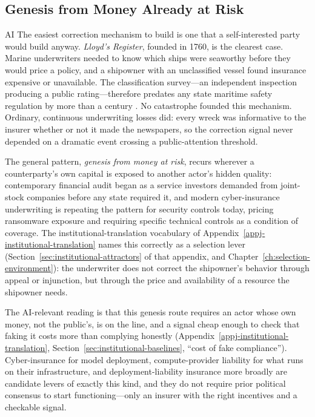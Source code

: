 \begin{refsection}
\section{Genesis from Money Already at Risk}
\label{sec:appm-genesis-money}
\begin{authbar}{AI}
The easiest correction mechanism to build is one that a self-interested party would build anyway.
\emph{Lloyd's Register}, founded in 1760, is the clearest case.
Marine underwriters needed to know which ships were seaworthy before they would price a policy, and a shipowner with an unclassified vessel found insurance expensive or unavailable.
The classification survey---an independent inspection producing a public rating---therefore predates any state maritime safety regulation by more than a century \autocite{kingston2007marine}.
No catastrophe founded this mechanism.
Ordinary, continuous underwriting losses did: every wreck was informative to the insurer whether or not it made the newspapers, so the correction signal never depended on a dramatic event crossing a public-attention threshold.

The general pattern, \emph{genesis from money at risk}, recurs wherever a counterparty's own capital is exposed to another actor's hidden quality: contemporary financial audit began as a service investors demanded from joint-stock companies before any state required it, and modern cyber-insurance underwriting is repeating the pattern for security controls today, pricing ransomware exposure and requiring specific technical controls as a condition of coverage.
The institutional-translation vocabulary of Appendix~\ref{appj-institutional-translation} names this correctly as a selection lever (Section~\ref{sec:institutional-attractors} of that appendix, and Chapter~\ref{ch:selection-environment}): the underwriter does not correct the shipowner's behavior through appeal or injunction, but through the price and availability of a resource the shipowner needs.

The AI-relevant reading is that this genesis route requires an actor whose own money, not the public's, is on the line, and a signal cheap enough to check that faking it costs more than complying honestly (Appendix~\ref{appj-institutional-translation}, Section~\ref{sec:institutional-baselines}, ``cost of fake compliance'').
Cyber-insurance for model deployment, compute-provider liability for what runs on their infrastructure, and deployment-liability insurance more broadly are candidate levers of exactly this kind, and they do not require prior political consensus to start functioning---only an insurer with the right incentives and a checkable signal.


\end{authbar}
\end{refsection}
